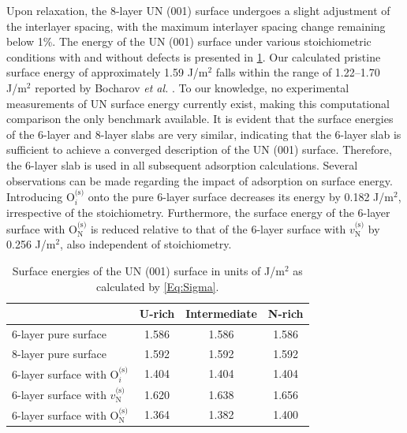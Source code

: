 \documentclass[preprint,12pt,sort&compress]{elsarticle}
\newcommand{\?}{\stackrel{?}{=}}
\begin{document}
Upon relaxation, the 8-layer UN (001) surface undergoes a slight adjustment of the interlayer spacing, with the maximum interlayer spacing change remaining below 1\%. The energy of the UN (001) surface under various stoichiometric conditions with and without defects is presented in \cref{Tab:SurfE}. Our calculated pristine surface energy of approximately 1.59 J/m$^2$ falls within the range of 1.22--1.70 J/m$^2$ reported by Bocharov \textit{et al.} \cite{Bocharov2011SS}. To our knowledge, no experimental measurements of UN surface energy currently exist, making this computational comparison the only benchmark available. It is evident that the surface energies of the 6-layer and 8-layer slabs are very similar, indicating that the 6-layer slab is sufficient to achieve a converged description of the UN (001) surface. Therefore, the 6-layer slab is used in all subsequent adsorption calculations. Several observations can be made regarding the impact of adsorption on surface energy. Introducing $\text{O}_i^{\text{(s)}}$ onto the pure 6-layer surface decreases its energy by 0.182 J/m$^2$, irrespective of the stoichiometry. Furthermore, the surface energy of the 6-layer surface with $\text{O}_\text{N}^{\text{(s)}}$ is reduced relative to that of the 6-layer surface with $v_\text{N}^{\text{(s)}}$ by 0.256 J/m$^2$, also independent of stoichiometry.

\begin{table}[h!]
\centering
\caption{Surface energies of the UN (001) surface in units of J/m$^2$ as calculated by \cref{Eq:Sigma}.}
\footnotesize
\begin{tabular}{lccc}
\hline
 & U-rich & Intermediate & N-rich \\
\hline
6-layer pure surface & 1.586 & 1.586 & 1.586 \\
8-layer pure surface  & 1.592 & 1.592 & 1.592 \\
6-layer surface with O$_i^\text{(s)}$ & 1.404 & 1.404 & 1.404 \\
6-layer surface with $v_\text{N}^\text{(s)}$ & 1.620 & 1.638 & 1.656 \\
6-layer surface with O$_\text{N}^\text{(s)}$ & 1.364 & 1.382 & 1.400 \\
\hline
\end{tabular}
\label{Tab:SurfE}
\end{table}
\end{document}
